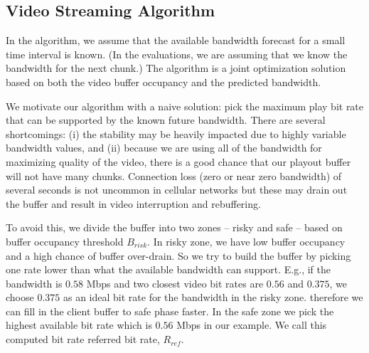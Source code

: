 \subsection{Video Streaming Algorithm} \label{subsec:online}

In the algorithm, we assume that the available bandwidth forecast for
a small time interval is known.
(In the evaluations, we are assuming that we know the bandwidth for
the next chunk.)
The algorithm is a joint optimization
solution based on both the video buffer occupancy and the predicted bandwidth. 


We motivate our algorithm with a naive solution: pick the maximum
 play bit rate that can be supported by the known future bandwidth. 
There are several shortcomings: (i) the stability may be heavily
impacted due to highly variable bandwidth values, and (ii)
because we are using all of the bandwidth for maximizing quality of
the video, there is a good chance that our playout buffer will not
have many chunks. 
Connection loss (zero or near zero bandwidth) of several seconds is
not uncommon in  cellular networks but these may drain out the buffer
and result in video interruption and rebuffering.

To avoid this, we divide the
buffer into two zones -- risky and safe -- based on buffer occupancy
threshold $B_{risk} $. In risky zone, we have low buffer occupancy and
a high chance of buffer over-drain. So we try to build the buffer by
picking one rate lower than what the available bandwidth can support.
E.g., if the bandwidth is $0.58$ Mbps and two closest video
bit rates are $0.56$ and $0.375$, we choose $ 0.375$ as an
ideal bit rate for the bandwidth in the risky zone. 
 therefore we can
fill in the client buffer to safe phase faster. 
In the safe zone we
pick the highest available bit rate which is $0.56$ Mbps in our
example. We call this computed bit rate referred bit rate, $R_{ref}$.

